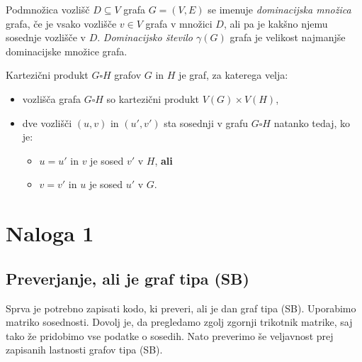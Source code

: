 \documentclass{article}
\begin{document}
\begin{definition}
   Podmnožica vozlišč $D\subseteq V$ grafa $G=(V,E)$ se imenuje \emph{dominacijska množica} grafa,
   če je vsako vozlišče $v\in V$ grafa v množici $D$, ali pa je kakšno njemu sosednje vozlišče
   v $D$. \emph{Dominacijsko število $\gamma(G)$} grafa je velikost najmanjše dominacijske
   množice grafa.
\end{definition}

\begin{definition}
    Kartezični produkt $G\square H$ grafov $G$ in $H$ je graf, za katerega velja:
    \begin{itemize}
        \item vozlišča grafa $G\square H$ so kartezični produkt $V(G)\times V(H)$,
        \item dve vozlišči $(u,v)$ in $(u',v')$ sta sosednji v grafu $G\square H$ natanko tedaj, ko je:
        \begin{itemize}
            \item $u=u'$ in $v$ je sosed $v'$ v $H$, \textbf{ali}
            \item $v=v'$ in $u$ je sosed $u'$ v $G$.
        \end{itemize}
    \end{itemize}
\end{definition}

\section{Naloga 1}
\subsection{Preverjanje, ali je graf tipa (SB)}
Sprva je potrebno zapisati kodo, ki preveri, ali je dan graf tipa (SB). Uporabimo matriko sosednosti. Dovolj je, 
da pregledamo zgolj zgornji trikotnik matrike, saj tako že pridobimo vse podatke o sosedih. Nato 
preverimo še veljavnost prej zapisanih lastnosti grafov tipa (SB).
\end{document}
